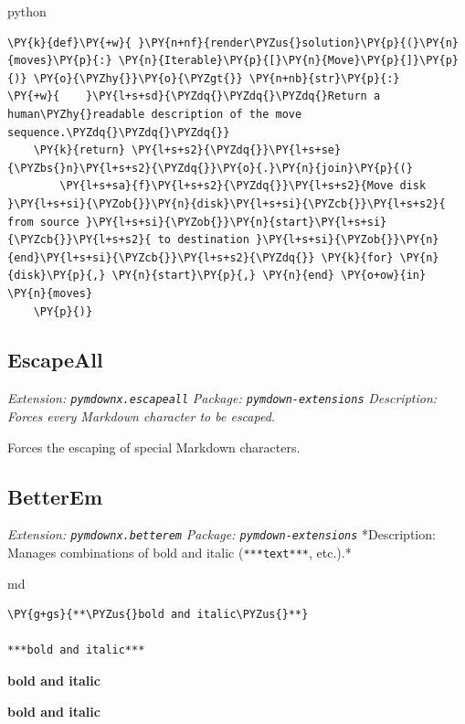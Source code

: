 \documentclass[a4paper,twoside]{article}
\begin{document}
\begin{code}{python}{}{}
\begin{Verbatim}[commandchars=\\\{\},breaklines, breakanywhere, commandchars=\\\{\}]
\PY{k}{def}\PY{+w}{ }\PY{n+nf}{render\PYZus{}solution}\PY{p}{(}\PY{n}{moves}\PY{p}{:} \PY{n}{Iterable}\PY{p}{[}\PY{n}{Move}\PY{p}{]}\PY{p}{)} \PY{o}{\PYZhy{}}\PY{o}{\PYZgt{}} \PY{n+nb}{str}\PY{p}{:}
\PY{+w}{    }\PY{l+s+sd}{\PYZdq{}\PYZdq{}\PYZdq{}Return a human\PYZhy{}readable description of the move sequence.\PYZdq{}\PYZdq{}\PYZdq{}}
    \PY{k}{return} \PY{l+s+s2}{\PYZdq{}}\PY{l+s+se}{\PYZbs{}n}\PY{l+s+s2}{\PYZdq{}}\PY{o}{.}\PY{n}{join}\PY{p}{(}
        \PY{l+s+sa}{f}\PY{l+s+s2}{\PYZdq{}}\PY{l+s+s2}{Move disk }\PY{l+s+si}{\PYZob{}}\PY{n}{disk}\PY{l+s+si}{\PYZcb{}}\PY{l+s+s2}{ from source }\PY{l+s+si}{\PYZob{}}\PY{n}{start}\PY{l+s+si}{\PYZcb{}}\PY{l+s+s2}{ to destination }\PY{l+s+si}{\PYZob{}}\PY{n}{end}\PY{l+s+si}{\PYZcb{}}\PY{l+s+s2}{\PYZdq{}} \PY{k}{for} \PY{n}{disk}\PY{p}{,} \PY{n}{start}\PY{p}{,} \PY{n}{end} \PY{o+ow}{in} \PY{n}{moves}
    \PY{p}{)}
\end{Verbatim}
\end{code}
\subsection{EscapeAll}\label{escapeall}

\emph{Extension: \texttt{pymdownx.escapeall}}
\emph{Package: \texttt{pymdown-\allowbreak{}extensions}}
\emph{Description: Forces every Markdown character to be escaped.}

Forces the escaping of special Markdown characters.

\subsection{BetterEm}\label{betterem}

\emph{Extension: \texttt{pymdownx.betterem}}
\emph{Package: \texttt{pymdown-\allowbreak{}extensions}}
*Description: Manages combinations of bold and italic (\texttt{***text***}, etc.).*

\begin{code}{md}{}{}
\begin{Verbatim}[commandchars=\\\{\},breaklines, breakanywhere, commandchars=\\\{\}]
\PY{g+gs}{**\PYZus{}bold and italic\PYZus{}**}

***bold and italic***
\end{Verbatim}
\end{code}
\begin{displayquote}

\providecommand{\tslead}[1]{\par\noindent\textbf{#1}\par\nobreak\smallskip}
\tslead{bold and italic}

\providecommand{\tslead}[1]{\par\noindent\textbf{#1}\par\nobreak\smallskip}
\tslead{bold and italic}

\end{displayquote}
\end{document}
